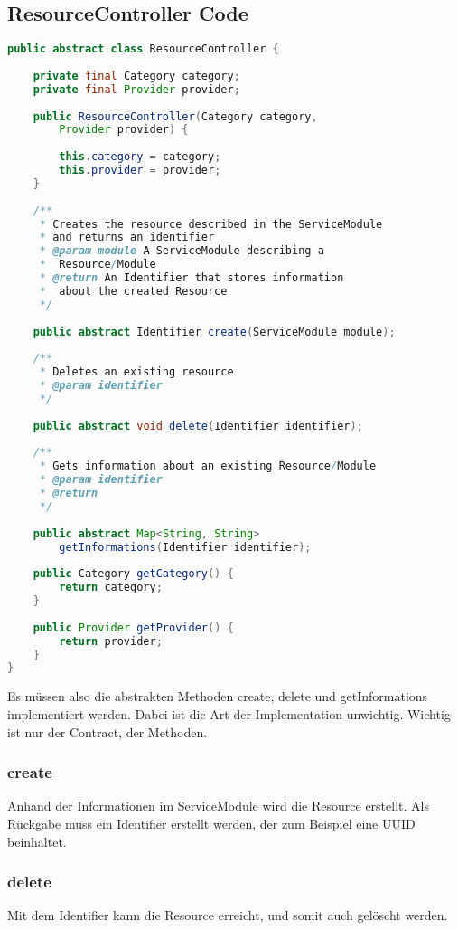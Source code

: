 \subsection{ResourceController Code}
\begin{lstlisting}[language=Java,frame=single] 
public abstract class ResourceController {
	
	private final Category category;
	private final Provider provider;
	
	public ResourceController(Category category, 
		Provider provider) {
		
		this.category = category;
		this.provider = provider;
	}
	
	/**
	 * Creates the resource described in the ServiceModule
	 * and returns an identifier
	 * @param module A ServiceModule describing a 
	 *	Resource/Module
	 * @return An Identifier that stores information 
	 *	about the created Resource
	 */
	
	public abstract Identifier create(ServiceModule module);
	
	/**
	 * Deletes an existing resource
	 * @param identifier 
	 */
	
	public abstract void delete(Identifier identifier);
	
	/**
	 * Gets information about an existing Resource/Module
	 * @param identifier
	 * @return 
	 */
	
	public abstract Map<String, String> 
		getInformations(Identifier identifier);
	
	public Category getCategory() {
		return category;
	}
	
	public Provider getProvider() {
		return provider;
	}
}
\end{lstlisting}
\newline
Es müssen also die abstrakten Methoden create, delete und getInformations implementiert werden. 
Dabei ist die Art der Implementation unwichtig. 
Wichtig ist nur der Contract, der Methoden.

\subsubsection{create}
Anhand der Informationen im ServiceModule wird die Resource erstellt. Als Rückgabe muss ein Identifier erstellt werden, der zum Beispiel eine UUID beinhaltet.

\subsubsection{delete}
Mit dem Identifier kann die Resource erreicht, und somit auch gelöscht werden.

